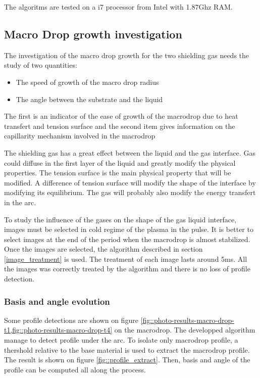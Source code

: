 \documentclass[12pt]{iopart}
\begin{document}
The algoritms are tested on a i7 processor from Intel with 1.87Ghz RAM.


\subsection{ Macro Drop growth investigation}
The investigation of the macro drop growth for the two shielding gas needs the study of two quantities:

\begin{itemize}
\item The speed of growth of the macro drop radius
\item The angle between the substrate and the liquid
\end{itemize}

The first is an indicator of the ease of growth of the macrodrop due to
heat transfert and tension surface and the second  item gives information
 on the capillarity mechanism involved in the macrodrop


The shielding gas has a great effect between the liquid and the gas interface. Gas could diffuse in the
first layer of the liquid and greatly modify the physical properties. The tension surface is the main physical
property that will be modified. A difference of tension surface will modify the shape of the interface by modifying
its equilibrium. The gas will probably also modify the energy transfert in the arc.

 To study the influence of the gases on the shape of the gas liquid interface, images must be selected in cold
regime of the plasma in the pulse. It is better to select images at the end of the period when the macrodrop is
almost stabilized. Once the images are selected, the algorithm described in section \ref{image_treatment} is used.
The treatment of each image lasts around 5ms. All the images was correctly treated by the algorithm and there is no loss
of profile detection.

\subsubsection{Basis and angle evolution} 
Some profile detections are shown on figure \ref{fig::photo-results-macro-drop-t1,fig::photo-results-macro-drop-t4} on the macrodrop.
 The developped algorithm manage to detect profile under the arc.
 To isolate only macrodrop profile, a thershold relative to the base material is used to extract the macrodrop profile.
The result is shown on figure \ref{fig::profile_extract}. Then, basis and angle of the profile can be computed
all along  the process.
\end{document}
